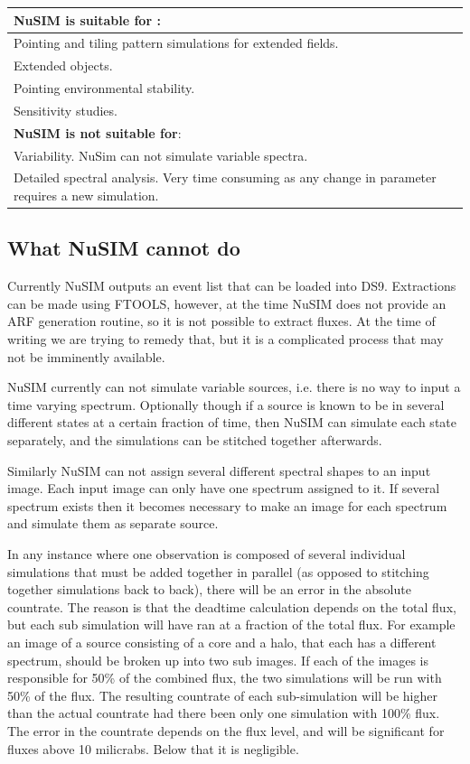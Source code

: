 \begin{center}
\begin{tabular}{|p{9cm}|}
\hline
\hline \textbf{NuSIM is suitable for} : \\ 
\hline  
\hline
Pointing and tiling pattern simulations for extended fields. \\
\hline
Extended objects. \\
\hline
Pointing environmental stability. \\
\hline
Sensitivity studies.\\
\hline
\hline \textbf{NuSIM is not suitable for}: \\
\hline
\hline
Variability. NuSim can not simulate variable spectra. \\
\hline
Detailed spectral analysis. Very time consuming as any change in parameter requires a new simulation.\\
\hline
\end{tabular} 
\end{center}

\subsection{What NuSIM cannot do}
Currently NuSIM outputs an event list that can be loaded into DS9. Extractions can be made using FTOOLS, however, at the time NuSIM does not provide an ARF generation routine, so it is not possible to extract fluxes. At the time of writing we are trying to remedy that, but it is a complicated process that may not be imminently available.

NuSIM currently can not simulate variable sources, i.e. there is no way to input a time varying spectrum. Optionally though if a source is known to be in several different states at a certain fraction of time, then NuSIM can simulate each state separately, and the simulations can be stitched together afterwards.

Similarly NuSIM can not assign several different spectral shapes to an input image. Each input image can only have one spectrum assigned to it. If several spectrum exists then it becomes necessary to make an image for each spectrum and simulate them as separate source.

In any instance where one observation is composed of several individual simulations that must be added together in parallel (as opposed to stitching together simulations back to back), there will be an error in the absolute countrate. The reason is that the deadtime calculation depends on the total flux, but each sub simulation will have ran at a fraction of the total flux. For example an image of a source consisting of a core and a halo, that each has a different spectrum, should be broken up into two sub images. If each of the images is responsible for 50\% of the combined flux, the two simulations will be run with 50\% of the flux. The resulting countrate of each sub-simulation will be higher than the actual countrate had there been only one simulation with 100\% flux. The error in the countrate depends on the flux level, and will be significant for fluxes above 10 milicrabs. Below that it is negligible.  


